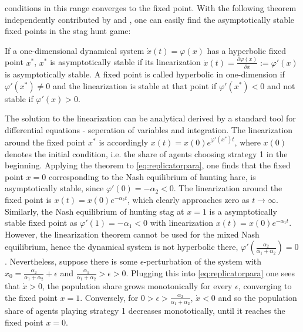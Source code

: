 conditions in this range converges to the fixed point. With the following 
theorem independently contributed by \cite{hartman_lemma_1960} and 
\cite{grobman_homeomorphism_1959}, one can easily 
find the asymptotically stable fixed points in the stag hunt game:
\begin{mydef}
        If a one-dimensional dynamical system $\dot{x}(t) = \varphi(x)$ 
        has a hyperbolic fixed point $x^*$, $x^*$ is asymptotically stable
        if its linearization 
        $\dot{x}(t) = \frac{\partial\varphi(x)}{\partial x} := \varphi'(x)$ 
        is asymptotically stable. 
        A fixed point is called hyperbolic in one-dimension if 
        $\varphi'(x^*) \neq 0$ and the linearization is stable at that
        point if $\varphi'(x^*) < 0$ and not stable if $\varphi'(x) >0$.
\end{mydef}
The solution to the linearization can be analytical derived by 
a standard tool for differential equations - seperation of variables and 
integration.
The linearization around the fixed point $x^*$ is accordingly
$x(t)= x(0) e^{\varphi'(x^*)t}$, where $x(0)$ denotes the 
initial condition, i.e. the share of agents choosing strategy 1 in the 
beginning.
Applying the theorem to \eqref{eq:replicatorpara}, one finds that the 
fixed point $x=0$ corresponding to the Nash equilibrium of hunting hare, is 
asymptotically stable, since $\varphi'(0) = - \alpha_2 <0$. 
The linearization around the fixed point is $x(t) = x(0) e^{-\alpha_2 t}$, 
which clearly approaches zero as $t \rightarrow \infty$. 
Similarly, the Nash equilibrium 
of hunting stag at $x=1$ is a asymptotically stable fixed point as
$\varphi'(1) = -\alpha_1 <0$ with linearization $x(t) = x(0) e^{-\alpha_1 t}$.
However, the linearization theorem cannot be used for the mixed Nash 
equilibrium, hence the dynamical system is not hyperbolic there, 
$\varphi'(\frac{\alpha_2}{\alpha_1+\alpha_2}) = 0$. Nevertheless, suppose 
there is some $\epsilon$-perturbation of the system  
with $x_0= \frac{\alpha_2}{\alpha_1+\alpha_2}+ \epsilon$ and 
$\frac{\alpha_1}{\alpha_1+\alpha_2} > \epsilon > 0$. Plugging this into
\eqref{eq:replicatorpara} one sees that $\dot{x} >0$, the population share
grows monotonically for every $\epsilon$, converging to the fixed point 
$x = 1$. Conversely, for $0 > \epsilon > \frac{\alpha_2}{\alpha_1+\alpha_2}$,
$\dot{x} < 0$ and so the population share of agents 
playing strategy 1 decreases monototically, until it reaches the 
fixed point $x=0$. 

